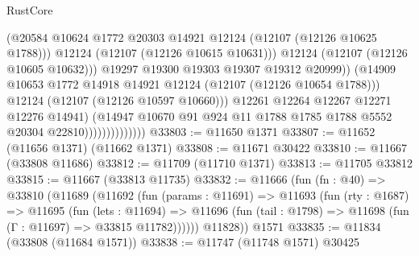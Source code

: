 \begin{lexlean}{RustCore}
\begin{coremodule}
                                          (@20584
                                            @10624
                                            @1772
                                            @20303
                                            @14921
                                            @12124
                                            (@12107 (@12126 @10625 @1788)))
                                          @12124
                                          (@12107 (@12126 @10615 @10631)))
                                        @12124
                                        (@12107 (@12126 @10605 @10632)))
                                      @19297
                                      @19300
                                      @19303
                                      @19307
                                      @19312
                                      @20999))
                                  (@14909
                                    @10653
                                    @1772
                                    @14918
                                    @14921
                                    @12124
                                    (@12107 (@12126 @10654 @1788)))
                                  @12124
                                  (@12107 (@12126 @10597 @10660)))
                                @12261
                                @12264
                                @12267
                                @12271
                                @12276
                                @14941)
                              (@14947
                                @10670
                                @91
                                @924
                                @11
                                @1788
                                @1785
                                @1788
                                @5552
                                @20304
                                @22810))))))))))))))
@33803 := @11650 @1371
@33807 := @11652 (@11656 @1371) (@11662 @1371)
@33808 := @11671 @30422
@33810 := @11667 (@33808 @11686)
@33812 := @11709 (@11710 @1371)
@33813 := @11705 @33812
@33815 := @11667 (@33813 @11735)
@33832 := @11666
    (fun (fn : @40) =>
    @33810
      (@11689
        (@11692
          (fun (params : @11691) =>
          @11693
            (fun (rty : @1687) =>
            @11695
              (fun (lets : @11694) =>
              @11696 (fun (tail : @1798) => @11698 (fun (Γ : @11697) => @33815 @11782))))))
        @11828))
    @1571
@33835 := @11834 (@33808 (@11684 @1571))
@33838 := @11747 (@11748 @1571) @30425

\end{coremodule}
\end{lexlean}
